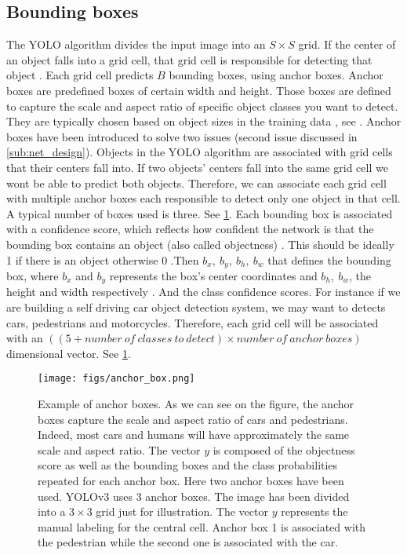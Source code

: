 \subsection{Bounding boxes}
The YOLO algorithm divides the input image into an $S \times S$ grid. If the center of an object falls into a grid cell, that grid cell is responsible
for detecting that object \cite{YOLOv1}. Each grid cell predicts $B$ bounding boxes, using anchor boxes. Anchor boxes are predefined boxes of certain width and height.
Those boxes are defined to capture the scale and aspect ratio of specific object classes you want to detect. They are typically chosen based on object
sizes in the training data \cite{MWAB}, see . Anchor boxes have been introduced to solve two issues (second issue discussed in \cref{sub:net_design}). Objects in the YOLO algorithm are associated with grid cells that their
centers fall into. If two objects' centers fall into the same grid cell we wont be able to predict both objects. Therefore, we can associate
each grid cell with multiple anchor boxes each responsible to detect only one object in that cell. A typical number of boxes used is three. See \cref{fig:yolo_output}.
Each bounding box is associated with a confidence score, which reflects how confident the network is that the bounding box contains an object (also called objectness) \cite{YOLOv1}.
This should be ideally 1 if there is an object otherwise 0 \cite{YOLOv3}.Then $b_{x},\ b_{y},\ b_{h},\ b_{w}$ that defines the bounding box, where $b_{x}$ and $b_{y}$ represents the box's
center coordinates and $b_{h},\ b_{w}$, the height and width respectively \cite{CERA}. And the class confidence scores. For instance if we are building a self driving car object detection system, we may want to detects cars, pedestrians and motorcycles. Therefore, each grid cell will be associated with
an $((5 + number\ of\ classes\ to\ detect) \times number\ of\ anchor\ boxes)$ dimensional vector. See \cref{fig:yolo_output}.

\begin{figure}[!htbp]
  \centering
  \texttt{[image: figs/anchor\_box.png]}
  \caption[Example of anchor boxes]{Example of anchor boxes. As we can see on the figure, the anchor boxes capture the scale and aspect ratio of cars and pedestrians. Indeed, most cars and humans will have approximately the same scale and aspect ratio. The vector $y$ is composed of the objectness score as well as the bounding boxes and the class probabilities repeated for each anchor box. Here two anchor boxes have been used. YOLOv3 uses 3 anchor boxes. The image has been divided into a $3 \times 3$ grid just for illustration. The vector $y$ represents the manual labeling for the central cell. Anchor box 1 is associated with the pedestrian while the second one is associated with the car.}\label{fig:yolo_output}
\end{figure}


